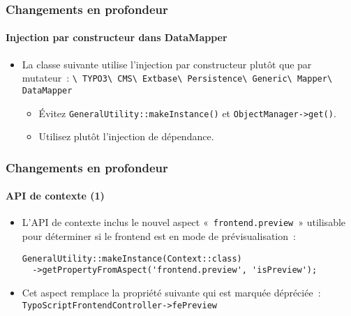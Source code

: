 \begin{frame}[fragile]
	\frametitle{Changements en profondeur}
	\framesubtitle{Injection par constructeur dans DataMapper}

	\begin{itemize}

		\item La classe suivante utilise l'injection par constructeur plutôt que par mutateur~:
			\smaller
				\texttt{\textbackslash
					TYPO3\textbackslash
					CMS\textbackslash
					Extbase\textbackslash
					Persistence\textbackslash
					Generic\textbackslash
					Mapper\textbackslash
					DataMapper}
			\normalsize

			\begin{itemize}\smaller
				\item[\ding{228}] Évitez \texttt{GeneralUtility::makeInstance()} et \texttt{ObjectManager->get()}.
				\item[\ding{228}] Utilisez plutôt l'injection de dépendance.
			\end{itemize}\normalsize

	\end{itemize}

\end{frame}


\begin{frame}[fragile]
	\frametitle{Changements en profondeur}
	\framesubtitle{API de contexte (1)}

	\lstset{basicstyle=\tiny\ttfamily}

	\begin{itemize}

		\item L'API de contexte inclus le nouvel aspect «~\texttt{frontend.preview}~»
			utilisable pour déterminer si le frontend est en mode de prévisualisation~:

\begin{lstlisting}
GeneralUtility::makeInstance(Context::class)
  ->getPropertyFromAspect('frontend.preview', 'isPreview');
\end{lstlisting}

		\item Cet aspect remplace la propriété suivante qui est marquée dépréciée~:
			\small\texttt{TypoScriptFrontendController->fePreview}\normalsize

	\end{itemize}

\end{frame}


